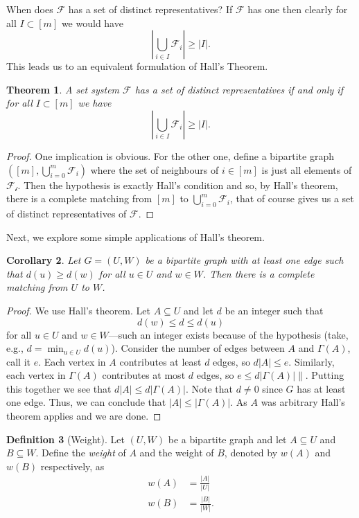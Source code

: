\documentclass{report}
\theoremstyle{definition}
\theoremstyle{plain}
\newtheorem{thm}{Theorem}[section]
\newtheorem{coro}[thm]{Corollary}
\theoremstyle{definition}
\newtheorem{defn}[thm]{Definition}
\begin{document}
	When does $\mathcal{F}$ has a set of distinct representatives? If $\mathcal{F}$ has one then clearly for all $I\subset [m]$ we would have
	\[
		\left|\bigcup_{i\in I}\mathcal{F}_i \right|\geq |I|.
	\]
	This leads us to an equivalent formulation of Hall's Theorem.
	\begin{thm}
		A set system $\mathcal{F}$ has a set of distinct representatives if and only if for all $I\subset [m]$ we have
		\[
			\left|\bigcup_{i\in I}\mathcal{F}_i \right|\geq |I|.
		\]
	\end{thm}
	\begin{proof}
		One implication is obvious. For the other one, define a bipartite graph $\left([m],\bigcup_{i=0}^m\mathcal{F}_i\right)$ where the set of neighbours of $i\in [m]$ is just all elements of $\mathcal{F_i}$. Then the hypothesis is exactly Hall's condition and so, by Hall's theorem, there is a complete matching from $[m]$ to $\bigcup_{i=0}^m\mathcal{F}_i$, that of course gives us a set of distinct representatives of $\mathcal{F}$. 
	\end{proof}
	Next, we explore some simple applications of Hall's theorem.
	\begin{coro}
		Let $G = (U,W)$ be a bipartite graph with at least one edge such that $d(u)\geq d(w)$ for all $u\in U$ and $w\in W$. Then there is a complete matching from $U$ to $W$.
	\end{coro}
	\begin{proof}
		We use Hall's theorem. Let $A\subseteq U$ and let $d$ be an integer such that 
		\[
			d(w) \leq d \leq d(u)
		\]
		for all $u\in U$ and $w\in W$---such an integer exists because of the hypothesis (take, e.g., $d=\min_{u\in U} d(u)$). Consider the number of edges between $A$ and $\Gamma(A)$, call it $e$. Each vertex in $A$ contributes at least $d$ edges, so $d|A|\leq e$. Similarly, each vertex in $\Gamma(A)$ contributes at most $d$ edges, so $e\leq d|\Gamma(A)|\|$. Putting this together we see that $d|A|\leq d|\Gamma(A)|$. Note that $d\neq 0$ since $G$ has at least one edge. Thus, we can conclude that $|A|\leq |\Gamma(A)|$. As $A$ was arbitrary Hall's theorem applies and we are done.
	\end{proof}
	\begin{defn}[Weight]
		Let $(U,W)$ be a bipartite graph and let $A\subseteq U$ and $B\subseteq W$. Define the \emph{weight} of $A$ and the weight of $B$, denoted by $w(A)$ and $w(B)$ respectively, as
		\begin{align*}
			w(A) &= \frac{|A|}{|U|}\\[6pt]
			w(B) &= \frac{|B|}{|W|}.
		\end{align*}
 	\end{defn}
\end{document}
